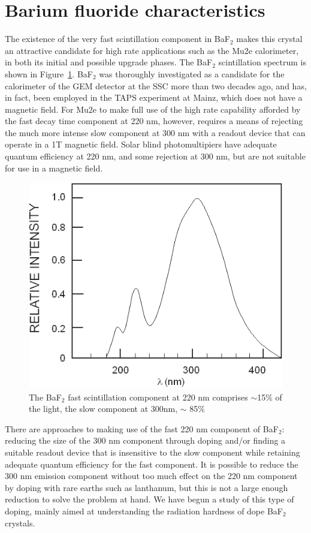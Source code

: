 \section{Barium fluoride characteristics}

The existence of the very fast scintillation component in BaF$_2$ makes this crystal an attractive candidate for high rate applications such as the Mu2e calorimeter, in both its initial and possible upgrade phases. The  BaF$_2$ scintillation spectrum is shown in Figure~\ref{fig:spectrum}.  BaF$_2$ was thoroughly investigated as a candidate for the calorimeter of the GEM detector at the SSC\cite{Zhu:1992pm} more than two decades ago, and has, in fact, been employed in the TAPS experiment\cite{Novotny:1998bj} at Mainz, which does not have a magnetic field. For Mu2e to make full use of the high rate capability afforded by the fast decay time component at 220 nm, however, requires a means of rejecting the much more intense slow component at 300 nm with a readout device that can operate in a 1T magnetic field.   Solar blind photomultipiers have adequate quantum efficiency at 220 nm, and some rejection at 300 nm, but are not suitable for use in a magnetic field.

\begin{figure}[h!]
\centering
\includegraphics[width=0.9\linewidth]{Figures/spectrum.png}
\caption{The  BaF$_2$ fast scintillation component at 220 nm comprises $\sim$15\% of the light, the slow component at 300nm, $\sim$ 85\%}
\label{fig:spectrum}
\end{figure}

There are approaches to making use of the fast 220 nm component of BaF$_2$: reducing the size of the 300 nm component through doping and/or finding a suitable readout device that is insensitive to the slow component while retaining adequate quantum efficiency for the fast component. It is possible to reduce the 300 nm emission component without too much effect on the 220 nm component by doping with rare earths such as lanthanum\cite{woody:1989}, but this is not a large enough reduction to solve the problem at hand. We have begun a study of this type of doping, mainly aimed at understanding the radiation hardness of dope BaF$_2$ crystals.

